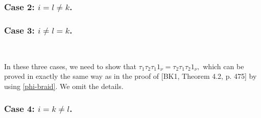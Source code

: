 \documentclass[11pt, reqno]{amsart} \textwidth=14.9cm \oddsidemargin=1cm \evensidemargin=1cm
\theoremstyle{definition}
\numberwithin{equation}{section}
\begin{document}
\subsubsection*{Case 2: $i=l\neq k$.}
\subsubsection*{Case 3: $i\neq l=k$.}


\

\vspace{0.3cm}\noindent In these three cases, we need to show that $\tau_{1}\tau_{2}\tau_{1}1_{\nu}=\tau_{2}\tau_{1}\tau_{2}1_{\nu},$ which can be proved in exactly the same way as in the proof of [BK1, Theorem 4.2, p. 475] by using \eqref{phi-braid}. We omit the details.

\subsubsection*{Case 4: $i=k\neq l$.}

\
\end{document}
